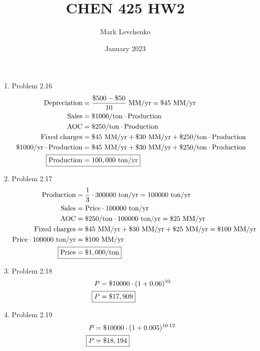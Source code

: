 \documentclass[12pt]{article}
\title{CHEN 425 HW2}
\author{Mark Levchenko}
\date{January 2023}
\begin{document}
\begin{enumerate}
    \item Problem 2.16
    \begin{align*}
        \text{Depreciation} &= \frac{\$500 - \$50}{10} \text{ MM/yr} = \$45\text{ MM/yr} \\
        \mathrm{Sales} &= \$1000/\mathrm{ton} \cdot \mathrm{Production} \\
        \mathrm{AOC} &= \$250/\mathrm{ton} \cdot \mathrm{Production} \\
        \text{Fixed charges} &= \$45\text{ MM/yr} + \$30\text{ MM/yr} + \$250/\mathrm{ton} \cdot \mathrm{Production} \\
        \$1000/\mathrm{yr} \cdot \mathrm{Production} &= \$45\text{ MM/yr} + \$30\text{ MM/yr} + \$250/\mathrm{ton} \cdot \mathrm{Production} \\
        \Aboxed{\mathrm{Production} &= 100,000 \text{ ton/yr}}
    \end{align*}

    \item Problem 2.17
    \begin{align*}
        \mathrm{Production} &= \frac{1}{3} \cdot 300000 \text{ ton/yr} = 100000 \text{ ton/yr} \\
        \mathrm{Sales} &= \mathrm{Price} \cdot 100000 \text{ ton/yr} \\
        \mathrm{AOC} &= \$250/\mathrm{ton} \cdot 100000 \text{ ton/yr} = \$25\text{ MM/yr} \\
        \text{Fixed charges} &= \$45\text{ MM/yr} + \$30\text{ MM/yr} + \$25\text{ MM/yr} = \$100\text{ MM/yr} \\
        \mathrm{Price} \cdot 100000 \text{ ton/yr} &= \$100\text{ MM/yr} \\
        \Aboxed{\mathrm{Price} &= \$1,000/\mathrm{ton}}
    \end{align*}

    \item Problem 2.18
    \begin{align*}
        P &= \$10000 \cdot (1 + 0.06)^{10} \\
        \Aboxed{P &= \$17,909}
    \end{align*}

    \item Problem 2.19
    \begin{align*}
        P &= \$10000 \cdot (1 + 0.005)^{10\cdot12} \\
        \Aboxed{P &= \$18,194}
    \end{align*}


\end{enumerate}
\end{document}
